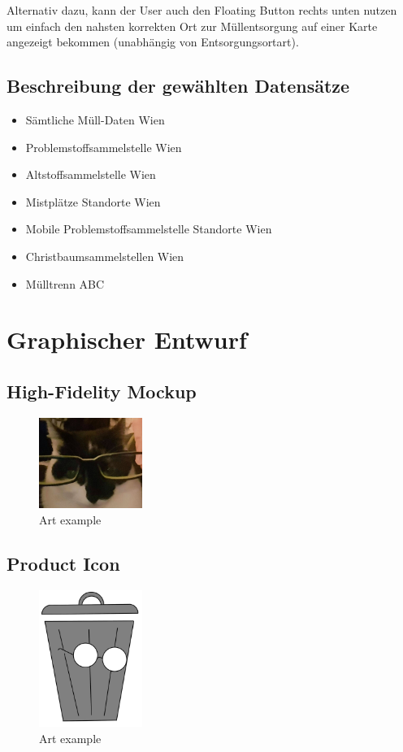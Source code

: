\documentclass[a4paper]{scrreprt}
\begin{document}
Alternativ dazu, kann der User auch den Floating Button rechts unten nutzen um einfach den nahsten korrekten Ort zur Müllentsorgung auf einer Karte angezeigt bekommen (unabhängig von Entsorgungsortart).

\section{Beschreibung der gewählten Datensätze}
\begin{itemize}
	\item Sämtliche Müll-Daten Wien \cite{alleMuell}
	\item Problemstoffsammelstelle Wien \cite{problemstoffsammelstellen}
	\item Altstoffsammelstelle Wien \cite{alstoffsammelstellen}
	\item Mistplätze Standorte Wien \cite{mistplaetze}
	\item Mobile Problemstoffsammelstelle Standorte Wien \cite{mobileProblemstoffsmst}
	\item Christbaumsammelstellen Wien \cite{christbaumsammelstellen}
	\item Mülltrenn ABC \cite{muelltrennabc}
\end{itemize}


\chapter{Graphischer Entwurf} 

\section{High-Fidelity Mockup}
\begin{figure}[h]
\centering
\includegraphics[width=0.3\textwidth]{../graphical/test.jpg}
\caption{\label{fig:art1} Art example}
\end{figure}

\section{Product Icon}
\begin{figure}[h]
\centering
\includegraphics[width=0.3\textwidth]{../graphical/logo_draft_color.png}
\caption{\label{fig:art2} Art example}
\end{figure}



\end{document}
